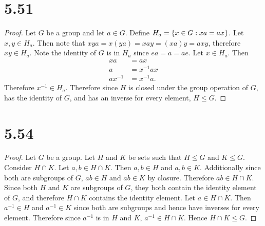\documentclass[12pt]{extarticle}
\begin{document}
\section*{5.51}
\begin{proof}
	Let $G$ be a group and let $a \in G$. Define $H_a = \qty{x \in G : xa = ax}$. Let $x,y \in H_a$. Then note that $xya = x(ya) = xay = (xa)y = axy$, therefore $xy \in H_a$. Note the identity of $G$ is in $H_a$ since $ea = a = ae$. Let $x \in H_a$. Then
	\begin{align*}
		xa &= ax \\
		a &= x^{-1}ax \\
		ax^{-1} &= x^{-1}a
	.\end{align*}
	Therefore $x^{-1} \in H_a$. Therefore since $H$ is closed under the group operation of $G$, has the identity of $G$, and has an inverse for every element, $H \leq G$.
\end{proof}

\section*{5.54}
\begin{proof}
	Let $G$ be a group. Let $H$ and $K$ be sets such that $H \leq G$ and $K \leq G$. Consider $H \cap K$. Let $a,b \in H \cap K$. Then $a,b \in H$ and $a,b \in K$. Additionally since both are subgroups of $G$, $ab \in H$ and $ab \in K$ by closure. Therefore $ab \in H \cap K$. Since both $H$ and $K$ are subgroups of $G$, they both contain the identity element of $G$, and therefore $H \cap K$ contains the identity element. Let $a \in H \cap K$. Then $a^{-1} \in H$ and $a^{-1} \in K$ since both are subgroups and hence have inverses for every element. Therefore since $a^{-1}$ is in $H$ and $K$, $a^{-1} \in H \cap K$. Hence $H \cap K \leq G$.
\end{proof}
\end{document}
